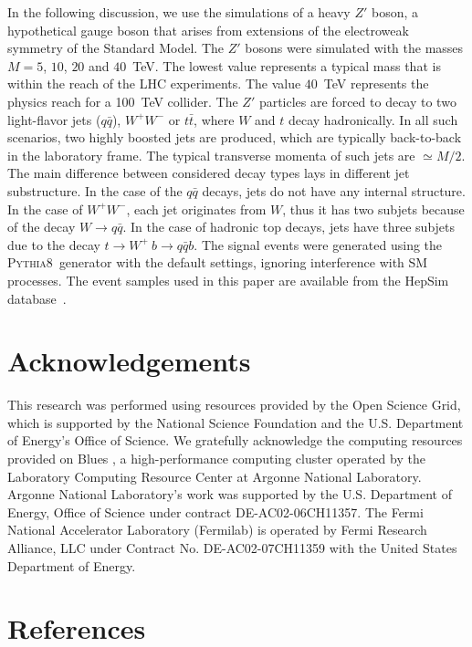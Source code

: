 \documentclass[final,1p,11pt]{elsarticle}
\newcommand{\pythia} {\textsc{Pythia8~}}
\begin{document}
In the following discussion, we use the simulations of a heavy $Z'$ boson, 
a hypothetical gauge boson  that arises from extensions of the electroweak symmetry of the Standard Model.
The $Z'$ bosons were simulated with the masses $M=5$, $10$, $20$ and $40$~TeV. The lowest value 
represents a typical mass that is within the reach of the LHC experiments. The  value $40$~TeV 
represents the physics reach for a  100~TeV collider. The $Z'$ particles are forced to decay 
to two light-flavor jets ($q\bar{q}$), $W^+W^-$ or $t\bar{t}$, where
$W$ and $t$ decay hadronically. In all such scenarios, two highly boosted
jets are produced,  which are typically back-to-back in the laboratory frame.
The typical transverse momenta of such jets are $\simeq M/2$.
The main difference between considered decay types lays in different jet substructure. In the case of the $q\bar{q}$ decays,
jets do not have any internal structure. In the case of  $W^+W^-$, each jet  originates from $W$, thus it has two
subjets  because of the decay $W\rightarrow q\bar{q}$. In the case of hadronic top decays, jets have three subjets due
to the decay $t \rightarrow  W^+\>b \rightarrow q\bar{q} b$.    
The signal events were generated using the \pythia generator with the default settings,
ignoring interference with SM processes.
The event samples used in this paper are  available from the
HepSim  database~\cite{Chekanov:2014fga}.















\section*{Acknowledgements}
This research was performed using resources provided by the Open Science Grid,
which is supported by the National Science Foundation and the U.S. Department of Energy's Office of Science. 
We gratefully acknowledge the computing resources provided on Blues
, 
a high-performance computing cluster operated by the Laboratory Computing Resource Center at Argonne National Laboratory.
Argonne National Laboratory's work was supported by the U.S. Department of Energy, Office of Science under contract DE-AC02-06CH11357.
The Fermi National Accelerator Laboratory (Fermilab) is operated by Fermi Research Alliance, LLC under Contract No. DE-AC02-07CH11359 with the United States Department of Energy.

\newpage
\section*{References}


\def\bibname{\Large\bf References}
\def\refname{\Large\bf References}
\pagestyle{plain}

\end{document}
